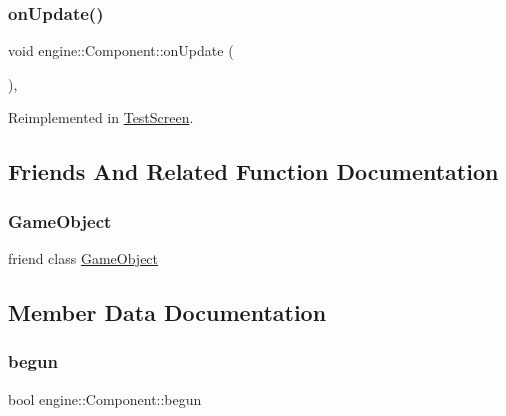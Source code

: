 \subsubsection{\texorpdfstring{on\+Update()}{onUpdate()}}
{\footnotesize\ttfamily void engine\+::\+Component\+::on\+Update (\begin{DoxyParamCaption}{ }\end{DoxyParamCaption})\hspace{0.3cm}{\ttfamily [private]}, {\ttfamily [virtual]}}



Reimplemented in \mbox{\hyperlink{class_test_screen_a991300ebe46989b859a2c68a15e9cad4}{Test\+Screen}}.



\subsection{Friends And Related Function Documentation}
\mbox{\label{classengine_1_1_component_a00df87c957d8f7ee0fc51f07a0542f4a}} 
\subsubsection{\texorpdfstring{Game\+Object}{GameObject}}
{\footnotesize\ttfamily friend class \mbox{\hyperlink{classengine_1_1_game_object}{Game\+Object}}\hspace{0.3cm}{\ttfamily [friend]}}



\subsection{Member Data Documentation}
\mbox{\label{classengine_1_1_component_ada25c7d14b898ac3802906b612f65ff9}} 
\subsubsection{\texorpdfstring{begun}{begun}}
{\footnotesize\ttfamily bool engine\+::\+Component\+::begun\hspace{0.3cm}{\ttfamily [private]}}

